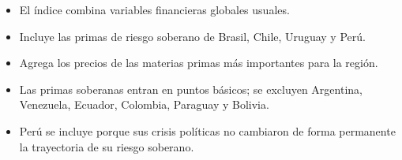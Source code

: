 \documentclass{article}
\newcommand{\cardtitlesize}{\fontsize{31.9}{38.3}\selectfont}
\newcommand{\cardtitle}[2][navy]{{\color{#1}\cardtitlesize\bfseries\textls[110]{\MakeUppercase{#2}}}\par\vspace{7mm}}
\begin{document}
\vfill
\hspace*{34mm}\begin{minipage}{773mm}
\begin{tcolorbox}[card]\cardtitle{Metodología}
\begin{minipage}[t]{0.48\linewidth}
\begin{itemize}
\item El índice combina variables financieras globales usuales.
\item Incluye las primas de riesgo soberano de Brasil, Chile, Uruguay y Perú.
\item Agrega los precios de las materias primas más importantes para la región.
\end{itemize}
\end{minipage}\hfill
\begin{minipage}[t]{0.48\linewidth}
\begin{itemize}
\item Las primas soberanas entran en puntos básicos; se excluyen Argentina, Venezuela, Ecuador, Colombia, Paraguay y Bolivia.
\item Perú se incluye porque sus crisis políticas no cambiaron de forma permanente la trayectoria de su riesgo soberano.
\end{itemize}
\end{minipage}
\end{tcolorbox}
\end{minipage}
\end{document}
